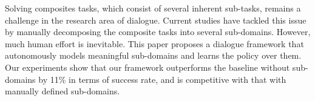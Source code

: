 Solving composites tasks, which consist of several inherent sub-tasks, remains a challenge in the research area of dialogue. Current studies have tackled this issue by manually decomposing the composite tasks into several sub-domains. However, much human effort is inevitable. This paper proposes a dialogue framework that autonomously models meaningful sub-domains and learns the policy over them. Our experiments show that our framework outperforms the baseline without sub-domains by 11\% in terms of success rate, and is competitive with that with manually defined sub-domains.
